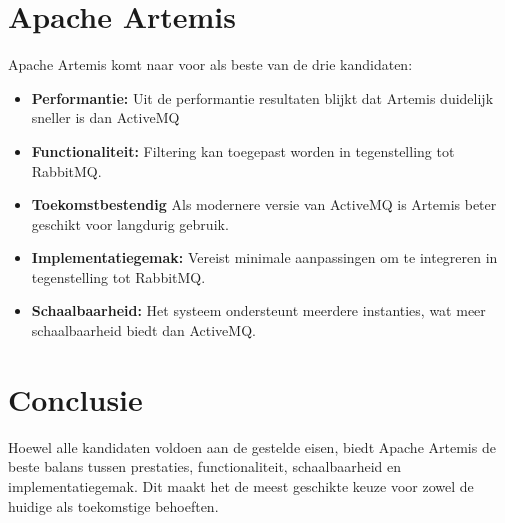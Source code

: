 \section{Apache Artemis}
Apache Artemis komt naar voor als beste van de drie kandidaten:
\begin{itemize}
    \item \textbf{Performantie:} Uit de performantie resultaten blijkt dat Artemis duidelijk sneller is dan ActiveMQ
    \item \textbf{Functionaliteit:} Filtering kan toegepast worden in tegenstelling tot RabbitMQ.
    \item \textbf{Toekomstbestendig} Als modernere versie van ActiveMQ is Artemis beter geschikt voor langdurig gebruik.
    \item \textbf{Implementatiegemak:} Vereist minimale aanpassingen om te integreren in tegenstelling tot RabbitMQ.
    \item \textbf{Schaalbaarheid:} Het systeem ondersteunt meerdere instanties, wat meer schaalbaarheid biedt dan ActiveMQ.
\end{itemize}  

\section{Conclusie}
Hoewel alle kandidaten voldoen aan de gestelde eisen, biedt Apache Artemis de beste balans tussen prestaties, 
functionaliteit, schaalbaarheid en implementatiegemak. 
Dit maakt het de meest geschikte keuze voor zowel de huidige als toekomstige behoeften.



